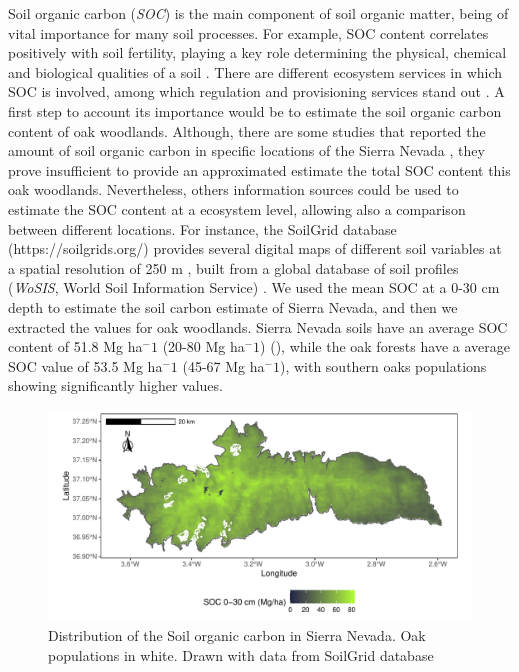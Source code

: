 Soil organic carbon (\emph{SOC}) is the main component of soil organic matter, being of vital importance for many soil processes. For example, SOC content correlates positively with soil fertility, playing a key role determining the physical, chemical and biological qualities of a soil \autocites{Victoriaetal2012BenefitsSoil}. There are different ecosystem services in which SOC is involved, among which regulation and provisioning services stand out \autocites{Francavigliaetal2018OrganicCarbon}. A first step to account its importance would be to estimate the soil organic carbon content of oak woodlands. Although, there are some studies that reported the amount of soil organic carbon in specific locations of the Sierra Nevada \autocites{CoboDiazetal2017TaxonomicFunctional,Lasaetal2019BacteriaEndosphere}, they prove insufficient to provide an approximated estimate the total SOC content this oak woodlands. Nevertheless, others information sources could be used to estimate the SOC content at a ecosystem level, allowing also a comparison between different locations. For instance, the SoilGrid database (https://soilgrids.org/) provides several digital maps of different soil variables at a spatial resolution of 250 m \autocites{Hengletal2017SoilGrids250mGlobal}, built from a global database of soil profiles (\emph{WoSIS}, World Soil Information Service) \autocites{Batjesetal2017WoSISProviding,Batjesetal2020StandardisedSoil}. We used the mean SOC at a 0-30 cm depth to estimate the soil carbon estimate of Sierra Nevada, and then we extracted the values for oak woodlands. Sierra Nevada soils have an average SOC content of 51.8 Mg ha$^-1$ (20-80 Mg ha$^-1$) (), while the oak forests have a average SOC value of 53.5 Mg ha$^-1$ (45-67 Mg ha$^-1$), with southern oaks populations showing significantly higher values. 

\begin{figure}
    \centering
    \includegraphics[width=\textwidth]{img/es/es-soc.pdf}\caption{Distribution of the Soil organic carbon in Sierra Nevada. Oak populations in white. Drawn with data from SoilGrid database}\label{fig:es:soc}
\end{figure}

